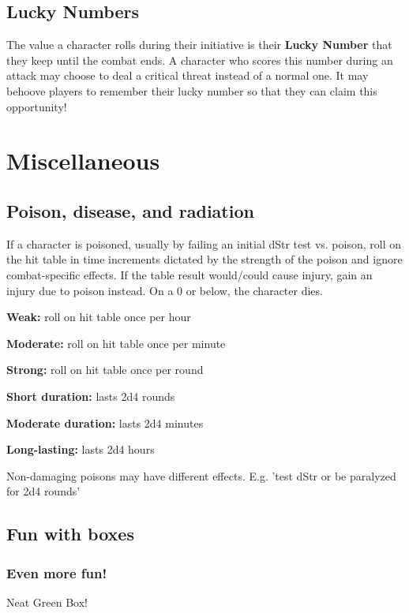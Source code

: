 \documentclass[10pt,twoside,twocolumn,openany]{book}
\begin{document}
\subsection{Lucky Numbers}
The value a character rolls during their initiative is their \textbf{Lucky Number} that they keep until the combat ends. A character who scores this number during an attack may choose to deal a critical threat instead of a normal one. It may behoove players to remember their lucky number so that they can claim this opportunity!

\section{Miscellaneous}
\subsection{Poison, disease, and radiation}
If a character is poisoned, usually by failing an initial dStr test vs. poison, roll on the hit table in time increments dictated by the strength of the poison and ignore combat-specific effects. If the table result would/could cause injury, gain an injury due to poison instead. On a 0 or below, the character dies.
\newline
\par \textbf{Weak:} roll on hit table once per hour
\par \textbf{Moderate:} roll on hit table once per minute
\par \textbf{Strong:} roll on hit table once per round
\newline
\par \textbf{Short duration:} lasts 2d4 rounds
\par \textbf{Moderate duration:} lasts 2d4 minutes
\par \textbf{Long-lasting:} lasts 2d4 hours
\newline
\par Non-damaging poisons may have different effects. E.g. 'test dStr or be paralyzed for 2d4 rounds'

\subsection{Fun with boxes}
\subsubsection{Even more fun!}


\begin{commentbox}{Neat Green Box!}
	\lipsum[1]
\end{commentbox}
\end{document}
